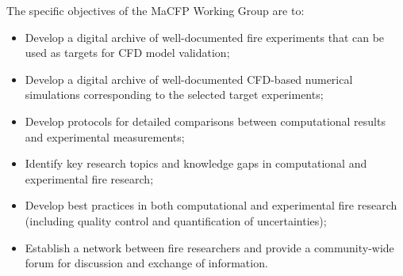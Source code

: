 \documentclass[12pt]{article}
\begin{document}
The specific objectives of the MaCFP Working Group are to: 
\begin{itemize}[noitemsep]
 \item Develop a digital archive of well-documented fire experiments that can be used as targets for CFD model validation; 
 \item Develop a digital archive of well-documented CFD-based numerical simulations corresponding to the selected target experiments; 
 \item Develop protocols for detailed comparisons between computational results and experimental measurements; 
 \item Identify key research topics and knowledge gaps in computational and experimental fire research; 
 \item Develop best practices in both computational and experimental fire research (including quality control and quantification of uncertainties); 
 \item Establish a network between fire researchers and provide a community-wide forum for discussion and exchange of information.	
\end{itemize}
\end{document}
